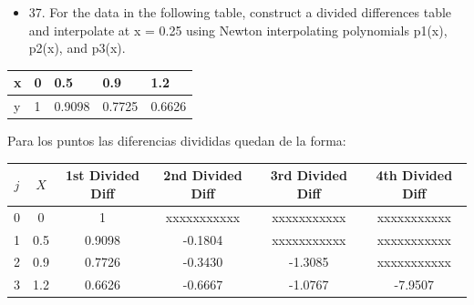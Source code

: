\documentclass{article}
\begin{document}
\newpage
\begin{itemize}
    \item 37. For the data in the following table, construct a divided differences
          table and interpolate at x = 0.25 using Newton interpolating
          polynomials p1(x), p2(x), and p3(x).
\end{itemize}

\begin{table}[h!]
    \begin{tabular}{l|l|l|l|l}
        \hline
        \multicolumn{1}{|p{30.865313pt}}{\raggedright x} & \multicolumn{1}{|p{31.618126pt}}{\raggedright 0} & \multicolumn{1}{|p{33.12375pt}}{\raggedright 0.5}    & \multicolumn{1}{|p{33.876564pt}}{\raggedright 0.9}    & \multicolumn{1}{|p{37.640625pt}|}{\raggedright 1.2}    \\
        \hline
        \multicolumn{1}{|p{30.865313pt}}{\raggedright y} & \multicolumn{1}{|p{31.618126pt}}{\raggedright 1} & \multicolumn{1}{|p{33.12375pt}}{\raggedright 0.9098} & \multicolumn{1}{|p{33.876564pt}}{\raggedright 0.7725} & \multicolumn{1}{|p{37.640625pt}|}{\raggedright 0.6626} \\
        \hline
    \end{tabular}
\end{table}
Para los puntos las diferencias divididas quedan de la forma:

\begin{center}
    \begin{tabular}{|c|c|c|c|c|c|}
    \hline
    \textbf{$j$} & \textbf{$X$} & \textbf{1st Divided Diff} & \textbf{2nd Divided Diff} & \textbf{3rd Divided Diff} & \textbf{4th Divided Diff} \\
    \hline
    0 & 0 & 1 & xxxxxxxxxxx & xxxxxxxxxxx & xxxxxxxxxxx\\
    \hline
    1 & 0.5 & 0.9098 & -0.1804 & xxxxxxxxxxx & xxxxxxxxxxx \\
    \hline
    2 & 0.9 & 0.7726 & -0.3430 & -1.3085 & xxxxxxxxxxx \\
    \hline
    3 & 1.2 & 0.6626 & -0.6667 & -1.0767 & -7.9507 \\
    \hline
    \end{tabular}
    \end{center}    
\end{document}
